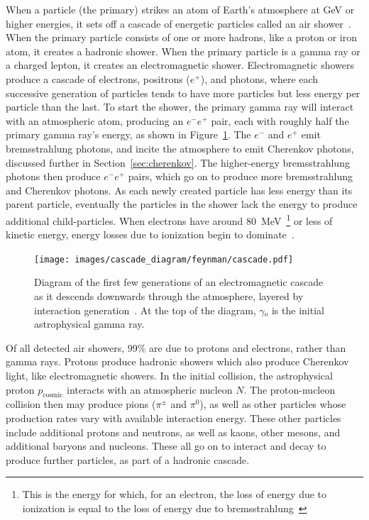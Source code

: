   When a particle (the primary) strikes an atom of Earth's atmosphere at GeV or higher energies, it sets off a cascade of energetic particles called an air shower~\cite{Bethe1934,Klein1999}.
  When the primary particle consists of one or more hadrons, like a proton or iron atom, it creates a hadronic shower.
  When the primary particle is a gamma ray or a charged lepton, it creates an electromagnetic shower.
  Electromagnetic showers produce a cascade of electrons, positrons ($e^{+}$), and photons, where each successive generation of particles tends to have more particles but less energy per particle than the last.
  To start the shower, the primary gamma ray will interact with an atmospheric atom, producing an $e^{-}e^{+}$ pair, each with roughly half the primary gamma ray's energy, as shown in Figure~\ref{fig:emcascade}.
  The $e^{-}$ and $e^{+}$ emit bremsstrahlung photons, and incite the atmosphere to emit Cherenkov photons, discussed further in Section~\ref{sec:cherenkov}.
  The higher-energy bremsstrahlung photons then produce $e^{-}e^{+}$ pairs, which go on to produce more bremsstrahlung and Cherenkov photons.
  As each newly created particle has less energy than its parent particle, eventually the particles in the shower lack the energy to produce additional child-particles.
  When electrons have around \SI{80}{\MeV{}}\footnote{This is the energy for which, for an electron, the loss of energy due to ionization is equal to the loss of energy due to bremsstrahlung~\cite{tanabashi2018review,berger196410}} or less of kinetic energy, energy losses due to ionization begin to dominate~\cite{pdg_2014}.

  \begin{figure}[t]
    \centering
    \texttt{[image: images/cascade\_diagram/feynman/cascade.pdf]}
    \caption[Electromagnetic Cascade]{
      Diagram of the first few generations of an electromagnetic cascade as it descends downwards through the atmosphere, layered by interaction generation~\cite{ellis2017tikz}.
      At the top of the diagram, $\gamma{}_o$ is the initial astrophysical gamma ray.
      \CaptionBlankLine
    }
    \label{fig:emcascade}
  \end{figure}

  Of all detected air showers, \nicetilde{}99\% are due to protons and electrons, rather than gamma rays.
  Protons produce hadronic showers which also produce Cherenkov light, like electromagnetic showers.
  In the initial collision, the astrophysical proton $p_{\textrm{cosmic}}$ interacts with an atmospheric nucleon $N$.
  The proton-nucleon collision then may produce pions ($\pi^{\pm}$ and $\pi^{0}$), as well as other particles whose production rates vary with available interaction energy.
  These other particles include additional protons and neutrons, as well as kaons, other mesons, and additional baryons and nucleons.
  These all go on to interact and decay to produce further particles, as part of a hadronic cascade.

